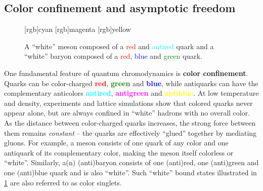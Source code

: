 \subsection*{Color confinement and asymptotic freedom}

\begin{figure}[t]
\centering
{}
[rgb]{cyan}
[rgb]{magenta}
[rgb]{yellow}
\caption{\label{fig:qcd:colorless_hadrons}%
	A ``white'' meson composed of a \textcolor{red}{red} and \textcolor{cyan}{antired} quark and
	a ``white'' baryon composed of a \textcolor{red}{red}, \textcolor{blue}{blue} and \textcolor{green}{green} quark.
}
\end{figure}

One fundamental feature of quantum chromodynamics is \textbf{color confinement}.
Quarks can be color-charged \textcolor{red}{\textbf{red}}, \textcolor{green}{\textbf{green}} and \textcolor{blue}{\textbf{blue}},
while antiquarks can have the complementary anticolors \textcolor{cyan}{\textbf{antired}}, \textcolor{magenta}{\textbf{antigreen}} and \textcolor{yellow}{\textbf{antiblue}}.
At low temperature and density, experiments and lattice simulations show that colored quarks never appear alone, but are always confined in ``white'' hadrons with no overall color.
As the distance between color-charged quarks increases, the strong force between them remains \emph{constant} -- the quarks are  effectively ``glued'' together by mediating gluons.
For example, a meson consists of one quark of any color and one antiquark of its complementary color, making the meson itself colorless or ``white''.
Similarly, a(n) (anti)baryon consists of one (anti)red, one (anti)green and one (anti)blue quark and is also ``white''.
Such ``white'' bound states illustrated in \cref{fig:qcd:colorless_hadrons} are also referred to as color singlets.

